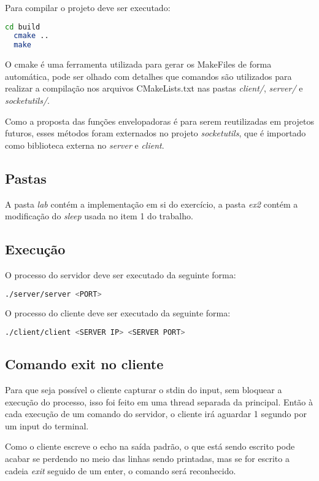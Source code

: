 \documentclass[12pt,a4paper]{report}
\begin{document}
Para compilar o projeto deve ser executado:

\begin{lstlisting}[language=bash]
  cd build
  cmake ..
  make
\end{lstlisting}

O cmake é uma ferramenta utilizada para gerar os MakeFiles de forma automática, pode ser olhado com detalhes que comandos são utilizados para realizar a compilação nos arquivos CMakeLists.txt nas pastas \emph{client/}, \emph{server/} e \emph{socketutils/}.

Como a proposta das funções envelopadoras é para serem reutilizadas em projetos futuros, esses métodos foram externados no projeto \emph{socketutils}, que é importado como biblioteca externa no \emph{server} e \emph{client}.

\subsection{Pastas}
A pasta \emph{lab} contém a implementação em si do exercício, a pasta \emph{ex2} contém a modificação do \emph{sleep} usada no item 1 do trabalho.

\subsection{Execução}

O processo do servidor deve ser executado da seguinte forma:
\begin{lstlisting}[language=bash]
  ./server/server <PORT>
\end{lstlisting}

O processo do cliente deve ser executado da seguinte forma:
\begin{lstlisting}[language=bash]
  ./client/client <SERVER IP> <SERVER PORT>
\end{lstlisting}

\subsection{Comando exit no cliente}
Para que seja possível o cliente capturar o stdin do input, sem bloquear a execução do processo, isso foi feito em uma thread separada da principal. Então à cada execução de um comando do servidor, o cliente irá aguardar 1 segundo por um input do terminal.

Como o cliente escreve o echo na saída padrão, o que está sendo escrito pode acabar se perdendo no meio das linhas sendo printadas, mas se for escrito a cadeia \emph{exit} seguido de um enter, o comando será reconhecido.
\end{document}

